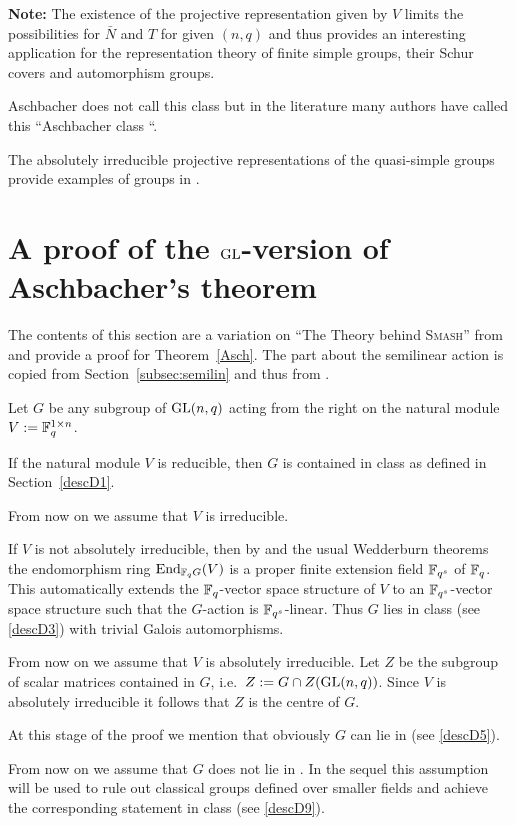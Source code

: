 \textbf{Note:} The existence of the projective representation given by $V$
limits the possibilities for $\bar N$ and $T$ for given $(n,q)$ and thus
provides an interesting application for the representation theory of finite
simple groups, their Schur covers and automorphism groups.

\medskip
{}
Aschbacher does not call this class  but in the literature many
authors have called this ``Aschbacher class ``.

\smallskip
\exmemb
The absolutely irreducible projective representations of the
quasi-simple groups provide examples of groups in .


\section{A proof of the $\mathbf{\GL}$-version of Aschbacher's theorem}
\label{AschProof}

The contents of this section are a variation on ``The Theory behind
\textsc{Smash}'' from \cite[Section~2]{smashnormal} and provide a proof for
Theorem~\ref{Asch}. The part about the semilinear action is copied
from Section~\ref{subsec:semilin} and thus from 
\cite[Section~6.4]{subfieldpaper}.

Let $G$ be any subgroup of $\GL(n,q)$ acting from the right on the
natural module $V := \mathbb{F}_q^{1 \times n}$.

If the natural module $V$ is reducible, then $G$ is contained in class 
as defined in Section~\ref{descD1}.

From now on we assume that $V$ is irreducible.

If $V$ is not absolutely irreducible, then by \cite[(29.13)]{CR0} and the 
usual Wedderburn theorems
the endomorphism ring $\End_{\F_q G}(V)$ is a proper finite extension field
$\mathbb{F}_{q^s}$ of $\mathbb{F}_q$. This automatically extends the $\mathbb{F}_q$-vector
space structure of $V$ to an $\mathbb{F}_{q^s}$-vector space structure
such that the $G$-action is $\mathbb{F}_{q^s}$-linear. Thus $G$ lies in class
 (see \ref{descD3}) with trivial Galois automorphisms.

From now on we assume that $V$ is absolutely irreducible. Let $Z$ be the
subgroup of scalar matrices contained in $G$, i.e.~$Z := G \cap
Z(\GL(n,q))$. Since $V$ is absolutely irreducible it follows that $Z$ is
the centre of $G$.

At this stage of the proof we mention that obviously $G$ can lie
in  (see \ref{descD5}).

From now on we assume that $G$ does not lie in . In the sequel this 
assumption will be used to rule out classical groups defined over
smaller fields and achieve the corresponding statement in class 
(see \ref{descD9}).

